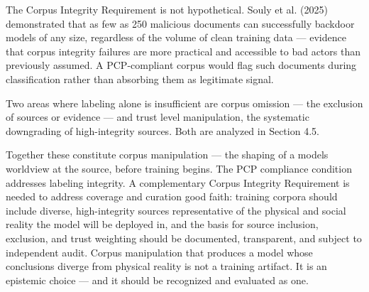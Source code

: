 \documentclass[12pt]{article}
\begin{document}
The Corpus Integrity Requirement is not hypothetical. Souly et al.
(2025) demonstrated that as few as 250 malicious documents can
successfully backdoor models of any size, regardless of the volume of
clean training data --- evidence that corpus integrity failures are more
practical and accessible to bad actors than previously assumed. A
PCP-compliant corpus would flag such documents during classification
rather than absorbing them as legitimate signal.

Two areas where labeling alone is insufficient are corpus omission ---
the exclusion of sources or evidence --- and trust level manipulation,
the systematic downgrading of high-integrity sources. Both are analyzed
in Section 4.5.

Together these constitute corpus manipulation --- the shaping of a
model\textquotesingle s worldview at the source, before training begins.
The PCP compliance condition addresses labeling integrity. A
complementary Corpus Integrity Requirement is needed to address coverage
and curation good faith: training corpora should include diverse,
high-integrity sources representative of the physical and social reality
the model will be deployed in, and the basis for source inclusion,
exclusion, and trust weighting should be documented, transparent, and
subject to independent audit. Corpus manipulation that produces a model
whose conclusions diverge from physical reality is not a training
artifact. It is an epistemic choice --- and it should be recognized and
evaluated as one.
\end{document}
